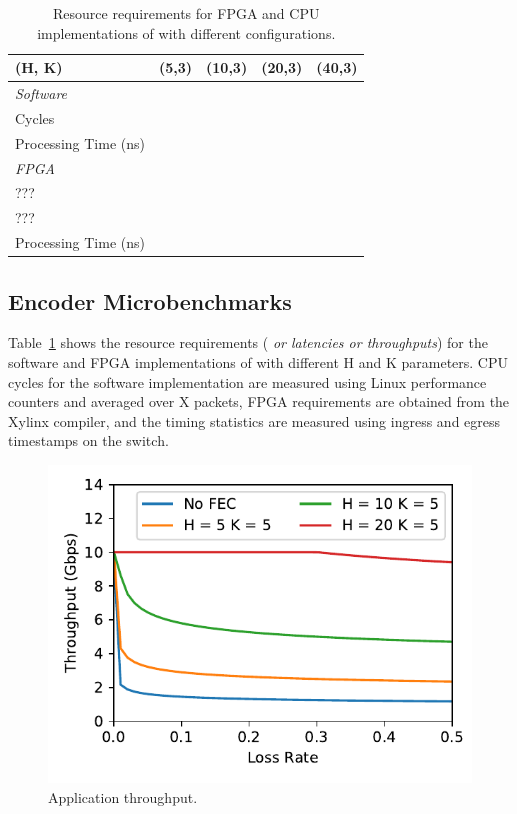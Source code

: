 \begin{table}
\begin{center}
\small
\begin{tabular}{ l l l l l } 
\toprule
(H, K) & (5,3) & (10,3) & (20,3) & (40,3) \\
\midrule
\emph{Software} & & & & \\
\cmidrule{1-1}
Cycles & & & & \\
Processing Time (ns) & & & & \\
\midrule
\emph{FPGA} & & & & \\
\cmidrule{1-1}
??? & & & & \\
??? & & & & \\
Processing Time (ns) & & & & \\
\bottomrule

\end{tabular}
\caption{Resource requirements for FPGA and CPU implementations of \OurSys with different configurations.}
\label{tab:microbenchmarks}
\end{center}
\end{table}

\subsection{Encoder Microbenchmarks}
Table~\ref{tab:microbenchmarks} shows the resource requirements (\emph{
or latencies or throughputs}) for the software and  FPGA implementations of
\OurSys with different H and K parameters. CPU cycles for the software
implementation are measured using Linux performance counters and averaged over
X packets, FPGA requirements are obtained from the Xylinx compiler, and the
timing statistics are measured using ingress and egress timestamps on the
switch.

\begin{figure}
  \centering
  \includegraphics[width=0.3\paperwidth]{fake_tput.pdf}
  \caption{\label{fig:app_tput} Application throughput.}
\end{figure}

